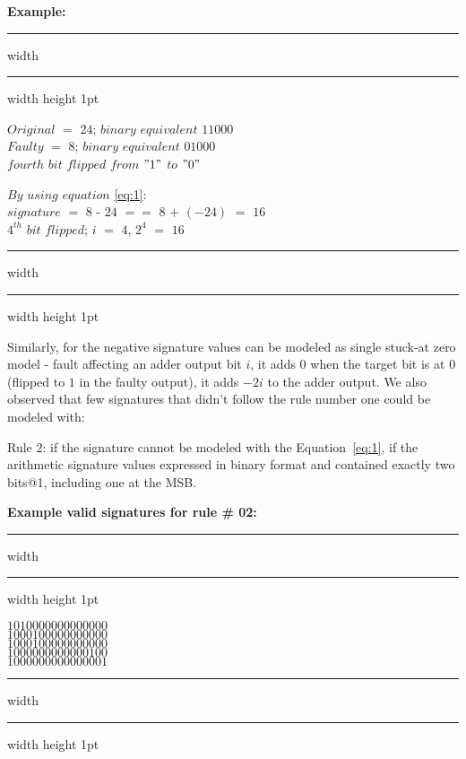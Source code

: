 \vspace{ 0.1 cm}
\hspace{-0.3 cm}\textbf{Example:}
\hrule height 2pt width \hsize \kern 1pt \hrule width \hsize height 1pt

\vspace{0.2 cm}
$Original$ $=$ $24$; $binary $ $ equivalent$ $11000$ \\

\hspace{-0.15cm} $Faulty$ $=$ $8$; $binary $ $ equivalent$ $01000$ \\

$fourth$ $bit$ $flipped$ $from$ $"1"$ $to$ $"0"$

$By$ $using$ $equation$ \ref{eq:1}: \\

$signature$ $=$ $8$ - $24$ $==$ $8$ $+$ $(-24)$ $=$ $16$ \\

$4^{th}$ $ bit $ $flipped$; $i$  $=$ $4$, $2^{4}$ $=$ $16$
\vspace{0.01cm}
\hrule height 2pt width \hsize \kern 1pt \hrule width \hsize height 1pt

\vspace{0.25 cm}

Similarly, for the negative signature values can be modeled as single stuck-at zero model - fault affecting an adder output bit $i$, it adds $0$ when the target bit is at $0$ (flipped to $1$ in the faulty output), it adds $-2i$ to the adder output. We also observed that few signatures that didn't follow the rule number one could be modeled with: 

Rule 2: if the signature cannot be modeled with the Equation~\ref{eq:1}, if the arithmetic signature values expressed in binary format and contained exactly two bits@1, including one at the MSB.

\hspace{-0.3 cm}\textbf{Example valid signatures for rule \# 02:}
\hrule height 2pt width \hsize \kern 1pt \hrule width \hsize height 1pt
\begin{center}
$1010 0000 0000 0000$ \\
$1000 1000 0000 0000$ \\
$1000 1000 0000 0000$ \\
$1000 0000 0000 0100$ \\
$1000 0000 0000 0001$ \\
\end{center}
\hrule height 2pt width \hsize \kern 1pt \hrule width \hsize height 1pt








